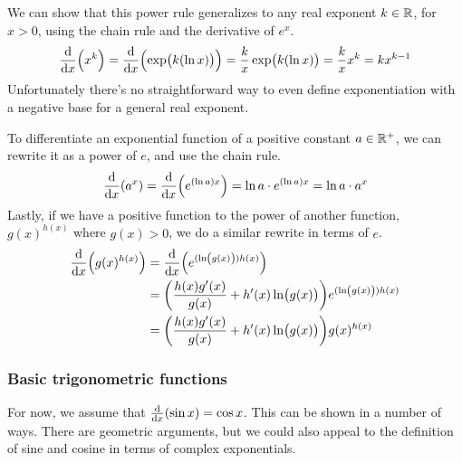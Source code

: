 We can show that this power rule generalizes to any real exponent \(k \in
\mathbb R\), for \(x > 0\), using the chain rule and the derivative of \(e^x\).
\begin{equation*}
\dv{x}(x^k) = \dv{x}(\exp(k(\ln x))) = \frac kx \exp(k(\ln x))
    = \frac kx x^k = k x^{k - 1}
\end{equation*}
Unfortunately there's no straightforward way to even define exponentiation
with a negative base for a general real exponent.

To differentiate an exponential function of a positive constant
\(a \in \mathbb R^+\), we can rewrite it as a power of \(e\), and use the chain
rule.
\begin{equation*}
\dv{x}(a^x) = \dv{x}(e^{(\ln a)x}) = \ln a \cdot e^{(\ln a)x}
    = \ln a \cdot a^x
\end{equation*}
Lastly, if we have a positive function to the power of another function,
\(g(x)^{h(x)}\) where \(g(x) > 0\), we do a similar rewrite in terms of
\(e\).
\begin{align*}
\dv{x}(g(x)^{h(x)}) &= \dv{x}(e^{(\ln(g(x)))h(x)}) \\
    &= \pqty{\frac{h(x)g'(x)}{g(x)} + h'(x)\ln(g(x))}e^{(\ln(g(x)))h(x)} \\
    &= \pqty{\frac{h(x)g'(x)}{g(x)} + h'(x)\ln(g(x))}g(x)^{h(x)}
\end{align*}

\subsubsection{Basic trigonometric functions} \label{sec_calc_trig_basic}


For now, we assume that \(\dv{x}(\sin x) = \cos x\). This can
be shown in a number of ways. There are geometric arguments, but we could
also appeal to the definition of sine and cosine in terms of complex
exponentials.

